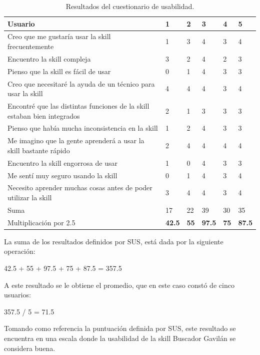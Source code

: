 \begin{table}
  \begin{center}
    \begin{tabular}{ | p{9cm} | p{1cm} | p{1cm} | p{1cm} | p{1cm} | p{1cm} | }
      \hline
      Usuario & 1 & 2 & 3 & 4 & 5 \\ \hline
      Creo que me gustaría usar la skill frecuentemente & 1 & 3 & 4 & 3 & 4 \\ \hline
      Encuentro la skill compleja & 3 & 2 & 4 & 2 & 3 \\ \hline
      Pienso que la skill es fácil de usar & 0 & 1 & 4 & 3 & 3 \\ \hline
      Creo que necesitaré la ayuda de un técnico para usar la skill & 4 & 4 & 4 & 3 & 4 \\ \hline
      Encontré que las distintas funciones de la skill estaban bien integrados & 2 & 1 & 3 & 3 & 3 \\ \hline
      Pienso que había mucha inconsistencia en la skill & 1 & 2 & 4 & 3 & 3 \\ \hline
      Me imagino que la gente aprenderá a usar la skill bastante rápido & 2 & 4 & 4 & 4 & 4 \\ \hline
      Encuentro la skill engorrosa de usar & 1 & 0 & 4 & 3 & 3 \\ \hline
      Me sentí muy seguro usando la skill & 0 & 1 & 4 & 3 & 4 \\ \hline
      Necesito aprender muchas cosas antes de poder utilizar la skill & 3 & 4 & 4 & 3 & 4 \\ \hline
      Suma & 17 & 22 & 39 & 30 & 35 \\ \hline
      Multiplicación por 2.5 & \textbf{42.5} & \textbf{55} & \textbf{97.5} & \textbf{75} & \textbf{87.5} \\ \hline
    \end{tabular}
    \caption{Resultados del cuestionario de usabilidad.}
    \label{tab:t45}
  \end{center}
\end{table}

La suma de los resultados definidos por SUS, está dada por la siguiente operación:

42.5 + 55 + 97.5 + 75 + 87.5 = 357.5

A este resultado se le obtiene el promedio, que en este caso constó de cinco usuarios:

357.5 / 5 = 71.5

Tomando como referencia la puntuación definida por SUS, este resultado se encuentra en una escala donde la usabilidad de la skill Buscador Gavilán se considera buena.

